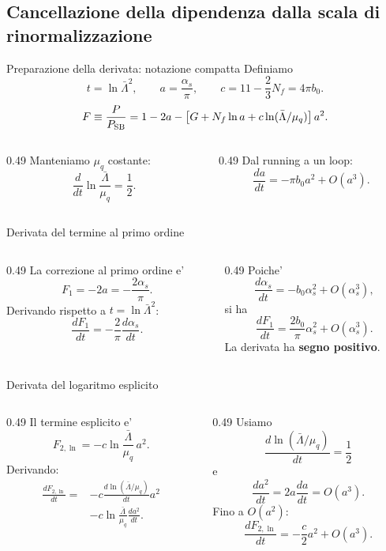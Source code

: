 \subsection{Cancellazione della dipendenza dalla scala di rinormalizzazione}

\begin{frame}{Preparazione della derivata: notazione compatta}
\small
Definiamo
\[
t=\ln\bar\Lambda^2,
\qquad a=\frac{\alpha_s}{\pi},
\qquad c=11-\frac23N_f=4\pi b_0.
\]
\[
F\equiv\frac{P}{P_{\rm SB}}
=1-2a-\left[G+N_f\ln a+c\ln(\bar\Lambda/\mu_q)\right]a^2.
\]
\begin{columns}[T,onlytextwidth]
\begin{column}{0.49\textwidth}
Manteniamo $\mu_q$ costante:
\[
\frac{d}{dt}\ln\frac{\bar\Lambda}{\mu_q}
=\frac12.
\]
\end{column}
\begin{column}{0.49\textwidth}
Dal running a un loop:
\[
\frac{da}{dt}=-\pi b_0a^2+O(a^3).
\]
\end{column}
\end{columns}
\end{frame}

\begin{frame}{Derivata del termine al primo ordine}
\small
\begin{columns}[T,onlytextwidth]
\begin{column}{0.49\textwidth}
La correzione al primo ordine e'
\[
F_1=-2a=-\frac{2\alpha_s}{\pi}.
\]
Derivando rispetto a $t=\ln\bar\Lambda^2$:
\[
\frac{dF_1}{dt}
=-\frac2\pi\frac{d\alpha_s}{dt}.
\]
\end{column}
\begin{column}{0.49\textwidth}
Poiche'
\[
\frac{d\alpha_s}{dt}
=-b_0\alpha_s^2+O(\alpha_s^3),
\]
si ha
\[
\frac{dF_1}{dt}
=\frac{2b_0}{\pi}\alpha_s^2
+O(\alpha_s^3).
\]
La derivata ha \textbf{segno positivo}.
\end{column}
\end{columns}
\end{frame}

\begin{frame}{Derivata del logaritmo esplicito}
\small
\begin{columns}[T,onlytextwidth]
\begin{column}{0.49\textwidth}
Il termine esplicito e'
\[
F_{2,\ln}=-c\ln\frac{\bar\Lambda}{\mu_q}\,a^2.
\]
Derivando:
\[
\begin{aligned}
\frac{dF_{2,\ln}}{dt}
={}&-c\frac{d\ln(\bar\Lambda/\mu_q)}{dt}a^2\\
&-c\ln\frac{\bar\Lambda}{\mu_q}\frac{da^2}{dt}.
\end{aligned}
\]
\end{column}
\begin{column}{0.49\textwidth}
Usiamo
\[
\frac{d\ln(\bar\Lambda/\mu_q)}{dt}=\frac12
\]
e
\[
\frac{da^2}{dt}=2a\frac{da}{dt}=O(a^3).
\]
Fino a $O(a^2)$:
\[
\frac{dF_{2,\ln}}{dt}
=-\frac c2a^2+O(a^3).
\]
\end{column}
\end{columns}
\end{frame}

